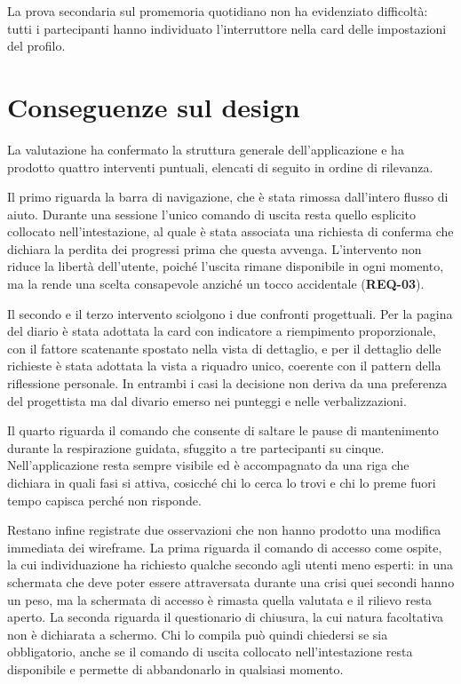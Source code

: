 La prova secondaria sul promemoria quotidiano non ha evidenziato difficoltà: tutti i partecipanti hanno individuato l'interruttore nella card delle impostazioni del profilo.

\section{Conseguenze sul design}
\label{sec:conseguenze-design}

La valutazione ha confermato la struttura generale dell'applicazione e ha prodotto quattro interventi puntuali, elencati di seguito in ordine di rilevanza.

Il primo riguarda la barra di navigazione, che è stata rimossa dall'intero flusso di aiuto.
Durante una sessione l'unico comando di uscita resta quello esplicito collocato nell'intestazione, al quale è stata associata una richiesta di conferma che dichiara la perdita dei progressi prima che questa avvenga.
L'intervento non riduce la libertà dell'utente, poiché l'uscita rimane disponibile in ogni momento, ma la rende una scelta consapevole anziché un tocco accidentale (\textbf{REQ-03}).

Il secondo e il terzo intervento sciolgono i due confronti progettuali.
Per la pagina del diario è stata adottata la card con indicatore a riempimento proporzionale, con il fattore scatenante spostato nella vista di dettaglio, e per il dettaglio delle richieste è stata adottata la vista a riquadro unico, coerente con il pattern della riflessione personale.
In entrambi i casi la decisione non deriva da una preferenza del progettista ma dal divario emerso nei punteggi e nelle verbalizzazioni.

Il quarto riguarda il comando che consente di saltare le pause di mantenimento durante la respirazione guidata, sfuggito a tre partecipanti su cinque.
Nell'applicazione resta sempre visibile ed è accompagnato da una riga che dichiara in quali fasi si attiva, cosicché chi lo cerca lo trovi e chi lo preme fuori tempo capisca perché non risponde.

Restano infine registrate due osservazioni che non hanno prodotto una modifica immediata dei wireframe.
La prima riguarda il comando di accesso come ospite, la cui individuazione ha richiesto qualche secondo agli utenti meno esperti: in una schermata che deve poter essere attraversata durante una crisi quei secondi hanno un peso, ma la schermata di accesso è rimasta quella valutata e il rilievo resta aperto.
La seconda riguarda il questionario di chiusura, la cui natura facoltativa non è dichiarata a schermo.
Chi lo compila può quindi chiedersi se sia obbligatorio, anche se il comando di uscita collocato nell'intestazione resta disponibile e permette di abbandonarlo in qualsiasi momento.
